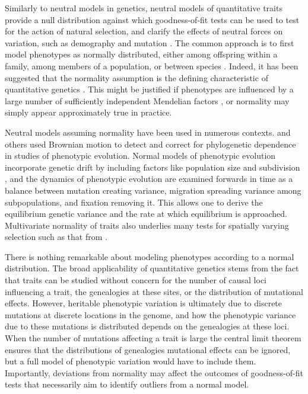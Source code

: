 Similarly to neutral models in genetics, neutral models of quantitative traits
provide a null distribution against which goodness-of-fit tests can be used to
test for the action of natural selection\citep{Lande1976}, and clarify the
effects of neutral forces on variation, such as demography and mutation
\citet{Lynch1986}. The common approach is to first model phenotypes as normally
distributed, either among offspring within a family, among members of a
population, or between species \citep{Turelli2017}. Indeed, it has been
suggested that the normality assumption is the defining characteristic of
quantitative genetics \citep{Rice2004}. This might be justified if phenotypes
are influenced by a large number of sufficiently independent Mendelian factors
\citep{Fisher1918}, or normality may simply appear approximately true in
practice.

Neutral models assuming normality have been used in numerous contexts.
\citet{Freckleton2002} and others used Brownian motion to detect and correct for
phylogenetic dependence in studies of phenotypic evolution. Normal models of
phenotypic evolution incorporate genetic drift by including factors like
population size and subdivision \citep{Chakraborty1982,Lynch1986,Lande1992}, and
the dynamics of phenotypic evolution are examined forwards in time as a balance
between mutation creating variance, migration spreading variance among
subpopulations, and fixation removing it. This allows one to derive the
equilibrium genetic variance and the rate at which equilibrium is approached.
Multivariate normality of traits also underlies many tests for spatially varying
selection such as that from \citet{Ovaskainen2011}.

There is nothing remarkable about modeling phenotypes according to a normal
distribution. The broad applicability of quantitative genetics stems from the
fact that traits can be studied without concern for the number of causal loci
influencing a trait, the genealogies at these sites, or the distribution of
mutational effects. However, heritable phenotypic variation is ultimately due to
discrete mutations at discrete locations in the genome, and how the phenotypic
variance due to these mutations is distributed depends on the genealogies at
these loci. When the number of mutations affecting a trait is large the central
limit theorem ensures that the distributions of genealogies mutational effects
can be ignored, but a full model of phenotypic variation would have to include
them. Importantly, deviations from normality may affect the outcomes of
goodness-of-fit tests that necessarily aim to identify outliers from a normal
model.

